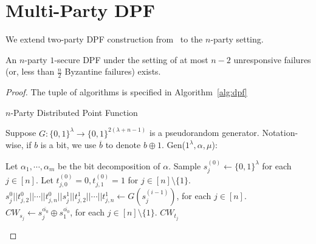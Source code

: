 \documentclass[11pt]{article}
\newcommand{\Gen}{\textsf{Gen}}
\begin{document}
\section{Multi-Party DPF}
We extend two-party DPF construction from~\cite{bgi18} to the $n$-party setting.
\begin{theorem}
An $n$-party $1$-secure DPF under the setting of at most $n-2$ unresponsive failures (or, less than $\frac{n}{2}$ Byzantine failures) exists.
\end{theorem}
\begin{proof}
The tuple of algorithms is specified in Algorithm~\ref{alg:dpf}

\begin{algorithm}
\caption{$n$-Party Distributed Point Function}\label{alg:dpf}
Suppose $G : \{0,1\}^\lambda \to \{0,1\}^{2(\lambda + n - 1)}$ is a pseudorandom generator. Notation-wise, if $b$ is a bit, we use $\overline{b}$ to denote $b \oplus 1$.
\vspace{10px}
\newline
\Gen($1^\lambda, \alpha, \mu$):
\begin{algorithmic}[1]
\State Let $\alpha_1, \cdots, \alpha_m$ be the bit decomposition of $\alpha$.
\State Sample $s_j^{(0)} \leftarrow \{0,1\}^{\lambda}$ for each $j \in [n]$.
\State Let $t_{j,0}^{(0)} = 0, t_{j,1}^{(0)} = 1$ for $j \in [n] \setminus \{1\}$.
\State $s_j^0||t_{j,2}^0||\cdots||t_{j,n}^0||s_j^{1}||t_{j,2}^1||\cdots||t_{j,n}^1 \leftarrow G(s_j^{(i-1)})$, for each $j \in [n]$.
\State $CW_{s_j} \leftarrow s_j^{\overline{\alpha_0}} \oplus s_1^{\overline{\alpha_0}}$, for each $j \in [n] \setminus \{1\}$.
\State $CW_{t_j}$
\EndFor
\end{algorithmic}
\end{algorithm}


\end{proof}




\end{document}
